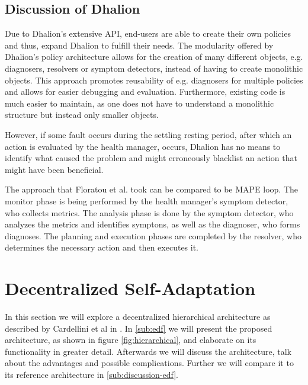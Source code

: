         \subsection{Discussion of Dhalion}
        \label{sub:dhalion-discussion}
        Due to Dhalion's extensive API, end-users are able to create their own policies and thus, expand Dhalion to fulfill their needs. 
        The modularity offered by Dhalion's policy architecture allows for the creation of many different objects, e.g. diagnosers, resolvers or symptom detectors, 
        instead of having to create monolithic objects.
        This approach promotes reusability of e.g. diagnosers for multiple policies and allows for easier debugging and evaluation.
        Furthermore, existing code is much easier to maintain, as one does not have to understand a monolithic structure but instead only smaller objects.
        
        \quad However, if some fault occurs during the settling resting period, after which an action is evaluated by the health manager, occurs, Dhalion has no means to 
        identify what caused the problem and might erroneously blacklist an action that might have been beneficial.

        \quad The approach that Floratou et al. took can be compared to be MAPE loop. The monitor phase is being performed by the health manager's symptom detector, who collects metrics.
        The analysis phase is done by the symptom detector, who analyzes the metrics and identifies symptons, as well as the diagnoser, who forms diagnoses.
        The planning and execution phases are completed by the resolver, who determines the necessary action and then executes it.

    \section{Decentralized Self-Adaptation}
    \label{sec:hierarchical}
    In this section we will explore a decentralized hierarchical architecture as described by Cardellini et al in \cite{cardellini}.
    In \ref{sub:edf} we will present the proposed architecture, as shown in figure \ref{fig:hierarchical}, and elaborate on its functionality in greater detail.
    Afterwards we will discuss the architecture, talk about the advantages and possible complications. Further we will compare it to its reference architecture in \ref{sub:discussion-edf}.


